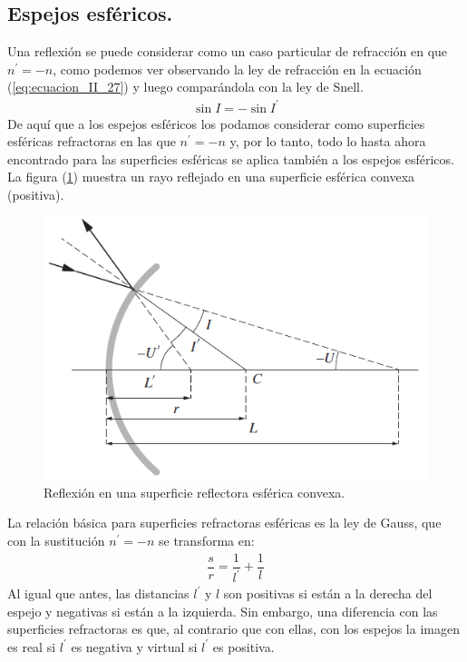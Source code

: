 \documentclass[14pt]{extarticle}
\begin{document}
\subsection{Espejos esféricos.}

Una reflexión se puede considerar como un caso particular de refracción en que $n^{\prime} = - n$, como podemos ver observando la ley de refracción en la ecuación (\ref{eq:ecuacion_II_27}) y luego comparándola con la ley de Snell.
\begin{align}
\sin I = - \sin I^{\prime}
\label{eq:ecuacion_II_27}
\end{align}
De aquí que a los espejos esféricos los podamos considerar como superficies esféricas refractoras en las que $n^{\prime} = - n$ y, por lo tanto, todo lo hasta ahora encontrado para las superficies esféricas se aplica también a los espejos esféricos. La figura (\ref{fig:figura_II_10}) muestra un rayo reflejado en una superficie esférica convexa (positiva).
\begin{figure}[H]
    \centering
    \includegraphics[scale=0.8]{Imagenes/Lentes_11.png}
    \caption{Reflexión en una superficie reflectora esférica convexa.}
    \label{fig:figura_II_10}
\end{figure}
La relación básica para superficies refractoras esféricas es la ley de Gauss, que con la sustitución $n^{\prime} = - n$ se transforma en:
\begin{align}
\dfrac{s}{r} = \dfrac{1}{l^{\prime}} + \dfrac{1}{l}
\label{eq:ecuacion_II_28}
\end{align}
Al igual que antes, las distancias $l^{\prime}$ y $l$ son positivas si están a la derecha del espejo
y negativas si están a la izquierda. Sin embargo, una diferencia con las superficies refractoras es que, al contrario que con ellas, con los espejos la imagen es real si $l^{\prime}$ es negativa y virtual si $l^{\prime}$ es positiva.
\end{document}
